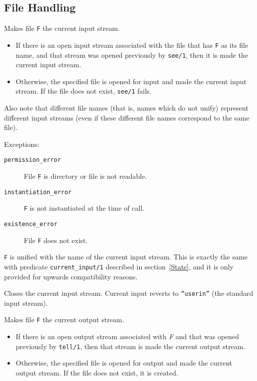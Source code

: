 \subsection{File Handling}
\begin{description}
    Makes file {\tt F} the current input stream. 
    \begin{itemize}
    \item If there is an open input stream associated with the file that 
          has {\tt F} as its file name, and that stream was opened previously
	  by {\tt see/1}, then it is made the current input stream.
    \item Otherwise, the specified file is opened for input and made the
          current input stream. If the file does not exist, {\tt see/1} 
	  fails.
    \end{itemize}
    Also note that different file names (that is, names which do not unify) 
    represent different input streams (even if these different file names 
    correspond to the same file).

    Exceptions:
    \begin{description}
    \item[{\tt permission\_error}]
    	File {\tt F} is directory or file is not readable. 
    \item[{\tt instantiation\_error}]
    	{\tt F} is not instantiated at the time of call. 
    \item[{\tt existence\_error}]
    	File {\tt F} does not exist. 
    \end{description}

    {\tt F} is unified with the name of the current input stream.
    This is exactly the same with predicate {\tt current\_input/1}
    described in section~\ref{State}, and it is only provided for
    upwards compatibility reasons.

    Closes the current input stream. 
    Current input reverts to {\tt ``userin''} (the standard input stream).

    Makes file {\tt F} the current output stream. 
    \begin{itemize}
    \item If there is an open output stream associated with {\em F}  
          and that was opened previously 
          by {\tt tell/1}, then that stream is made the current output 
	  stream. 
    \item Otherwise, the specified file is opened for output and made the
          current output stream. If the file does not exist, it is created.
    \end{itemize}


\end{description}
